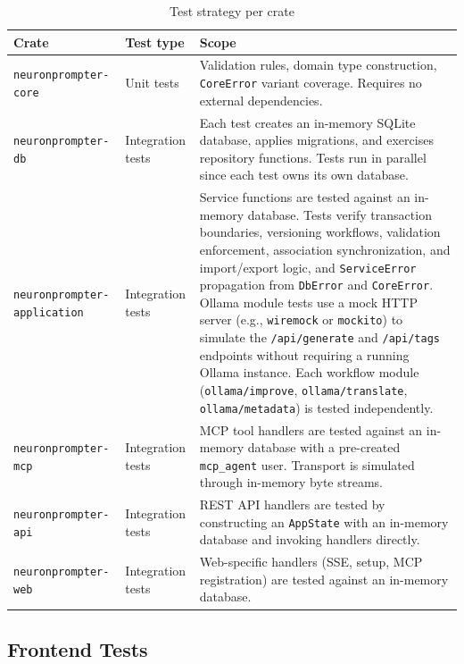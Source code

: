 \documentclass[a4paper, 11pt, oneside]{report}
\begin{document}
\begin{table}[H]
  \centering
  \caption{Test strategy per crate}
  \label{tab:testing}
  \begin{tabularx}{\textwidth}{l l X}
    \toprule
    \textbf{Crate} & \textbf{Test type} & \textbf{Scope} \\
    \midrule
    \texttt{neuronprompter-core} & Unit tests &
      Validation rules, domain type construction,
      \texttt{CoreError} variant coverage.
      Requires no external dependencies. \\
    \texttt{neuronprompter-db}   & Integration tests &
      Each test creates an in-memory SQLite database, applies
      migrations, and exercises repository functions.  Tests
      run in parallel since each test owns its own database. \\
    \texttt{neuronprompter-application} & Integration tests &
      Service functions are tested against an in-memory database.
      Tests verify transaction boundaries, versioning workflows,
      validation enforcement, association synchronization, and
      import/export logic, and \texttt{ServiceError} propagation
      from \texttt{DbError} and \texttt{CoreError}.  Ollama module
      tests use a mock HTTP server (e.g., \texttt{wiremock} or
      \texttt{mockito}) to simulate the \texttt{/api/generate} and
      \texttt{/api/tags} endpoints without requiring a running
      Ollama instance.  Each workflow module
      (\texttt{ollama/improve}, \texttt{ollama/translate},
      \texttt{ollama/metadata}) is tested independently. \\
    \texttt{neuronprompter-mcp}  & Integration tests &
      MCP tool handlers are tested against an in-memory database
      with a pre-created \texttt{mcp\_agent} user.  Transport is
      simulated through in-memory byte streams. \\
    \texttt{neuronprompter-api}  & Integration tests &
      REST API handlers are tested by constructing an \texttt{AppState}
      with an in-memory database and invoking handlers directly. \\
    \texttt{neuronprompter-web}  & Integration tests &
      Web-specific handlers (SSE, setup, MCP registration) are
      tested against an in-memory database. \\
    \bottomrule
  \end{tabularx}
\end{table}

\subsection{Frontend Tests}
\label{sec:frontend-tests}
\end{document}
